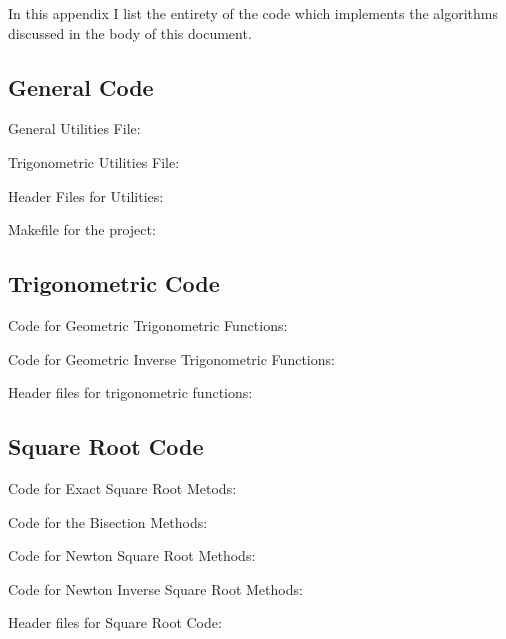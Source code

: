 \renewcommand{\thelstlisting}{}
\renewcommand{\lstlistingname}{File}

In this appendix I list the entirety of the code which implements the algorithms discussed in the body of this document.

\subsection{General Code}
General Utilities File:


Trigonometric Utilities File:


Header Files for Utilities:



Makefile for the project:


\subsection{Trigonometric Code}
Code for Geometric Trigonometric Functions:


Code for Geometric Inverse Trigonometric Functions:


Header files for trigonometric functions:



\subsection{Square Root Code}
Code for Exact Square Root Metods:


Code for the Bisection Methods:


Code for Newton Square Root Methods:


Code for Newton Inverse Square Root Methods:


Header files for Square Root Code:




